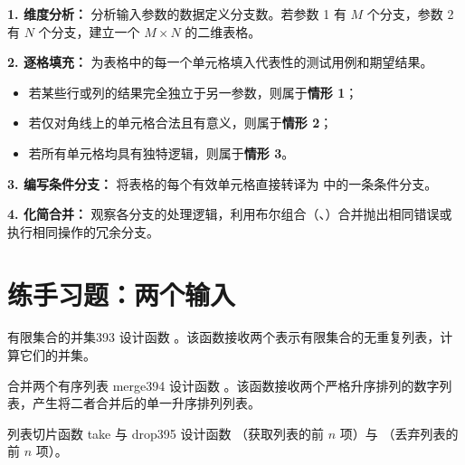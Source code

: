 \begin{recipebox}[处理两个复杂输入的设计配方]
\textbf{1. 维度分析：} 分析输入参数的数据定义分支数。若参数 1 有 $M$ 个分支，参数 2 有 $N$ 个分支，建立一个 $M \times N$ 的二维表格。

\textbf{2. 逐格填充：} 为表格中的每一个单元格填入代表性的测试用例和期望结果。
\begin{itemize}
  \item 若某些行或列的结果完全独立于另一参数，则属于\textbf{情形 1}；
  \item 若仅对角线上的单元格合法且有意义，则属于\textbf{情形 2}；
  \item 若所有单元格均具有独特逻辑，则属于\textbf{情形 3}。
\end{itemize}

\textbf{3. 编写条件分支：} 将表格的每个有效单元格直接转译为  中的一条条件分支。

\textbf{4. 化简合并：} 观察各分支的处理逻辑，利用布尔组合（、）合并抛出相同错误或执行相同操作的冗余分支。
\end{recipebox}

\section{练手习题：两个输入 }
\label{sec:23.6_finger_exercises}

\begin{exercise}{有限集合的并集}{393}
设计函数 。该函数接收两个表示有限集合的无重复列表，计算它们的并集。
\end{exercise}

\begin{exercise}{合并两个有序列表 merge}{394}
设计函数 。该函数接收两个严格升序排列的数字列表，产生将二者合并后的单一升序排列列表。
\end{exercise}

\begin{exercise}{列表切片函数 take 与 drop}{395}
设计函数 （获取列表的前 $n$ 项）与 （丢弃列表的前 $n$ 项）。
\end{exercise}

